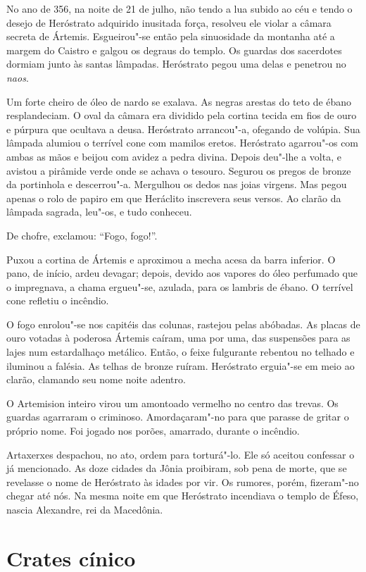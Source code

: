 No ano de 356, na noite de 21 de julho, não tendo a lua subido ao céu e
tendo o desejo de Heróstrato adquirido inusitada força, resolveu ele
violar a câmara secreta de Ártemis. Esgueirou"-se então pela sinuosidade da
montanha até a margem do Caistro e galgou os degraus do templo. Os guardas
dos sacerdotes dormiam junto às santas lâmpadas. Heróstrato pegou uma
delas e penetrou no \textit{naos}.

Um forte cheiro de óleo de nardo se exalava. As negras arestas do teto de
ébano resplandeciam. O oval da câmara era dividido pela cortina tecida em
fios de ouro e púrpura que ocultava a deusa. Heróstrato arrancou"-a,
ofegando de volúpia. Sua lâmpada alumiou o terrível cone com mamilos
eretos. Heróstrato agarrou"-os com ambas as mãos e beijou com avidez a
pedra divina. Depois deu"-lhe a volta, e avistou a pirâmide verde onde se
achava o tesouro. Segurou os pregos de bronze da portinhola e descerrou"-a.
Mergulhou os dedos nas joias virgens. Mas pegou apenas o rolo de papiro em
que Heráclito inscrevera seus versos. Ao clarão da lâmpada sagrada,
leu"-os, e tudo conheceu.

De chofre, exclamou: “Fogo, fogo!”.

Puxou a cortina de Ártemis e aproximou a mecha acesa da barra inferior. O
pano, de início, ardeu devagar; depois, devido aos vapores do óleo
perfumado que o impregnava, a chama ergueu"-se, azulada, para os lambris de
ébano. O terrível cone refletiu o incêndio.

O fogo enrolou"-se nos capitéis das colunas, rastejou pelas abóbadas. As
placas de ouro votadas à poderosa Ártemis caíram, uma por uma, das
suspensões para as lajes num estardalhaço metálico. Então, o feixe
fulgurante rebentou no telhado e iluminou a falésia. As telhas de bronze
ruíram. Heróstrato erguia"-se em meio ao clarão, clamando seu nome noite
adentro.

O Artemision inteiro virou um amontoado vermelho no centro das trevas. Os
guardas agarraram o criminoso. Amordaçaram"-no para que parasse de gritar o
próprio nome. Foi jogado nos porões, amarrado, durante o incêndio.

Artaxerxes despachou, no ato, ordem para torturá"-lo. Ele só aceitou
confessar o já mencionado. As doze cidades da Jônia proibiram, sob pena de
morte, que se revelasse o nome de Heróstrato às idades por vir. Os
rumores, porém, fizeram"-no chegar até nós. Na mesma noite em que
Heróstrato incendiava o templo de Éfeso, nascia Alexandre, rei da
Macedônia.

\chapter{Crates cínico}

